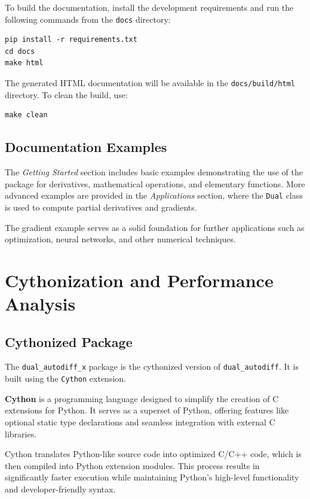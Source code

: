 \documentclass{article}
\begin{document}
To build the documentation, install the development requirements and run the following commands from the \texttt{docs} directory:

\begin{lstlisting}[style=input]
pip install -r requirements.txt
cd docs
make html
\end{lstlisting}

The generated HTML documentation will be available in the \texttt{docs/build/html} directory. To clean the build, use:

\begin{lstlisting}[style=input] 
make clean 
\end{lstlisting}

\subsection{Documentation Examples}

The \textit{Getting Started} section includes basic examples demonstrating the use of the package for derivatives, mathematical operations, and elementary functions. More advanced examples are provided in the \textit{Applications} section, where the \texttt{Dual} class is used to compute partial derivatives and gradients.

The gradient example serves as a solid foundation for further applications such as optimization, neural networks, and other numerical techniques.

\section{Cythonization and Performance Analysis}

\subsection{Cythonized Package}

The \texttt{dual\_autodiff\_x} package is the cythonized version of \texttt{dual\_autodiff}. It is built using the \texttt{Cython} extension. \cite{cython_org}\cite{cython_docs_quickstart}

\textbf{Cython} is a programming language designed to simplify the creation of C extensions for Python. It serves as a superset of Python, offering features like optional static type declarations and seamless integration with external C libraries.

Cython translates Python-like source code into optimized C/C++ code, which is then compiled into Python extension modules. This process results in significantly faster execution while maintaining Python's high-level functionality and developer-friendly syntax.
\end{document}
